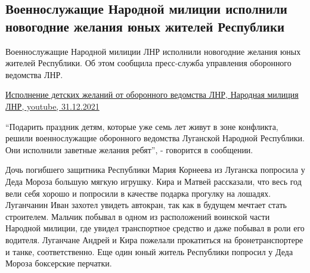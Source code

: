  
 
 
 
 
\subsection{Военнослужащие Народной милиции исполнили новогодние желания юных жителей Республики}
\label{sec:31_12_2021.stz.news.lnr.lug_info.2.nm_lnr_deti_podarki}


Военнослужащие Народной милиции ЛНР исполнили новогодние желания юных жителей
Республики. Об этом сообщила пресс-служба управления оборонного ведомства ЛНР.

\href{https://www.youtube.com/watch?v=68fsZ-leq40}{%
Исполнение детских желаний от оборонного ведомства ЛНР, Народная милиция ЛНР, youtube, 31.12.2021%
}


\enquote{Подарить праздник детям, которые уже семь лет живут в зоне конфликта, решили
военнослужащие оборонного ведомства Луганской Народной Республики. Они
исполнили заветные желания ребят}, - говорится в сообщении.


Дочь погибшего защитника Республики Мария Корнеева из Луганска попросила у Деда
Мороза большую мягкую игрушку. Кира и Матвей рассказали, что весь год вели себя
хорошо и попросили в качестве подарка прогулку на лошадях. Луганчанин Иван
захотел увидеть автокран, так как в будущем мечтает стать строителем. Мальчик
побывал в одном из расположений воинской части Народной милиции, где увидел
транспортное средство и даже побывал в роли его водителя. Луганчане Андрей и
Кира пожелали прокатиться на бронетранспортере и танке, соответственно. Еще
один юный житель Республики попросил у Деда Мороза боксерские перчатки.

